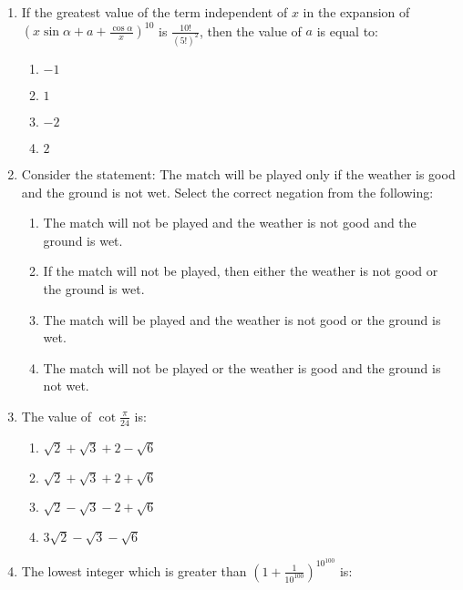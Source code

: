 \documentclass[journal]{IEEEtran}
\newcommand{\brak}[1]{\left( #1 \right)}
\begin{document}
\begin{enumerate}
    \item If the greatest value of the term independent of $x$ in the expansion of $\brak{x\sin\alpha+a+\frac{\cos\alpha}{x}}^{10}$ is $\frac{10!}{\brak{5!}^2}$, then the value of $a$ is equal to:
    
        \begin{multicols}{4}
        \begin{enumerate}
        \item $-1$
        \item $1$
        \item $-2$
        \item $2$
        \end{enumerate}
        \end{multicols}

    \item Consider the statement: The match will be played only if the weather is good and the ground is not wet. Select the correct negation from the following:
    
   
        \begin{enumerate}
        \item The match will not be played and the weather is not good and the ground is wet.
        \item If the match will not be played, then either the weather is not good or the ground is wet.
        \item The match will be played and the weather is not good or the ground is wet.
        \item The match will not be played or the weather is good and the ground is not wet.
        \end{enumerate}
        

    \item The value of $\cot\frac{\pi}{24}$ is:
        
        \begin{enumerate}
        \item $\sqrt{2}+\sqrt{3}+2-\sqrt{6}$
        \item $\sqrt{2}+\sqrt{3}+2+\sqrt{6}$
        \item $\sqrt{2}-\sqrt{3}-2+\sqrt{6}$
        \item $3\sqrt{2}-\sqrt{3}-\sqrt{6}$
        \end{enumerate}
        
    \item The lowest integer which is greater than $\brak{1+\frac{1}{10^{100}}}^{10^{100}}$ is:


\end{enumerate}
\end{document}
